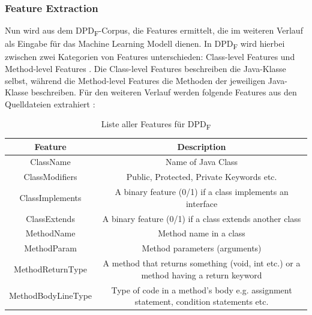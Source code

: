 \documentclass[conference]{IEEEtran}
\begin{document}
\subsubsection*{Feature Extraction}

Nun wird aus dem DPD\textsubscript{F}-Corpus, die Features ermittelt, die im weiteren Verlauf als Eingabe für das Machine Learning Modell dienen. In DPD\textsubscript{F} wird hierbei zwischen zwei Kategorien von Features unterschieden: Class-level Features und Method-level Features \cite[p. 5]{NAZAR2022111179}.
Die Class-level Features beschreiben die Java-Klasse selbst, während die Method-level Features die Methoden der jeweiligen Java-Klasse beschreiben.
Für den weiteren Verlauf werden folgende Features aus den Quelldateien extrahiert \cite[p. 5]{NAZAR2022111179}:

\begin{table}
    \centering
    \caption{Liste aller Features für DPD\textsubscript{F}}
    \label{table:6}
    \begin{tabular}{|c|c|}
        \hline
        Feature              & Description                                                                          \\
        \hline
        ClassName            & Name of Java Class                                                                   \\
        \hline
        ClassModiﬁers        & Public, Protected, Private Keywords etc.                                             \\
        \hline
        ClassImplements      & A binary feature (0/1) if a class implements an interface                            \\
        \hline
        ClassExtends         & A binary feature (0/1) if a class extends another class                              \\
        \hline
        MethodName           & Method name in a class                                                               \\
        \hline
        MethodParam          & Method parameters (arguments)                                                        \\
        \hline
        MethodReturnType     & A method that returns something (void, int etc.) or a method having a return keyword \\
        \hline
        MethodBodyLineType   & Type of code in a method’s body e.g. assignment statement, condition statements etc. \\

\end{tabular}
\end{table}
\end{document}
